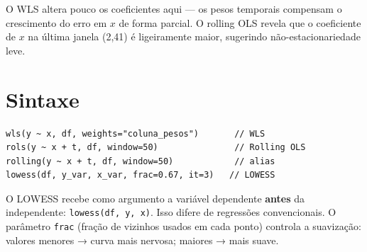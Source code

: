 O WLS altera pouco os coeficientes aqui — os pesos temporais compensam o
crescimento do erro em $x$ de forma parcial. O rolling OLS revela que o
coeficiente de $x$ na última janela (2{,}41) é ligeiramente maior, sugerindo
não-estacionariedade leve.

\section{Sintaxe}

\begin{lstlisting}
wls(y ~ x, df, weights="coluna_pesos")       // WLS
rols(y ~ x + t, df, window=50)               // Rolling OLS
rolling(y ~ x + t, df, window=50)            // alias
lowess(df, y_var, x_var, frac=0.67, it=3)   // LOWESS
\end{lstlisting}

\begin{nota}
  O LOWESS recebe como argumento a variável dependente \textbf{antes} da
  independente: \texttt{lowess(df, y, x)}. Isso difere de regressões
  convencionais. O parâmetro \texttt{frac} (fração de vizinhos usados em
  cada ponto) controla a suavização: valores menores → curva mais nervosa;
  maiores → mais suave.
\end{nota}
